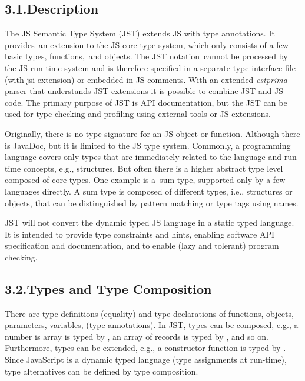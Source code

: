 \documentclass{article}
\begin{document}
\subsection{3.1.\hspace*{0.5em}Description}\label{sec2-description1}%
\def\mdkSubSection{\mdline{9}\mdline{9}Description}\lfoot{\textit{\mdkSection - \mdkSubSection}}
\noindent{}The JS Semantic Type System (JST) extends JS with type annotations. It provides an extension to the JS core type system, which only consists of a few basic types, functions, and objects. The JST notation cannot be processed by the JS run-time system and is therefore specified in a separate type interface file (with jsi extension) or embedded in JS comments. With an extended \emph{estprima} parser that understands JST extensions it is possible to combine JST and JS code. The primary purpose of JST is API documentation, but the JST can be used for type checking and profiling using external tools or JS extensions.%

Originally, there is no type signature for an JS object or function. Although there is JavaDoc, but it is limited to the JS type system. Commonly, a programming language covers only types that are immediately related to the language and run-time concepts, e.g., structures. But often there is a higher abstract type level composed of core types. One example is a sum type, supported only by a few languages directly. A sum type is composed of different types, i.e., structures or objects, that can be distinguished by pattern matching or type tags using names.%

JST will not convert the dynamic typed JS language in a static typed language. It is intended to provide type constraints and hints, enabling software API specification and documentation, and to enable (lazy and tolerant) program checking.%

\subsection{3.2.\hspace*{0.5em}Types and Type Composition}\label{sec2-types-and-type-composition}%
\def\mdkSubSection{\mdline{17}\mdline{17}Types and Type Composition}\lfoot{\textit{\mdkSection - \mdkSubSection}}
\noindent{}There are type definitions  (equality) and type declarations of functions, objects, parameters, variables,  (type annotations). In JST, types can be composed, e.g., a number is array is typed by , an array of records is typed by \mdcode{\{\}~{}[]}, and so on. Furthermore, types can be extended, e.g., a constructor function is typed by . Since JavaScript is a dynamic typed language (type assignments at run-time), type alternatives can be defined by  type composition.%
\end{document}
